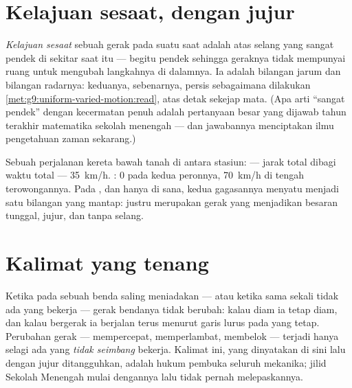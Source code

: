 \section{Kelajuan sesaat, dengan jujur}

\begin{definition}\label{def:g9:uniform-varied-motion:instant}
\emph{Kelajuan sesaat} sebuah gerak pada suatu
saat adalah  atas selang yang sangat pendek di
sekitar saat itu --- begitu pendek sehingga geraknya tidak mempunyai
ruang untuk mengubah langkahnya di dalamnya. Ia adalah bilangan jarum
 dan bilangan radarnya: keduanya, sebenarnya, 
persis sebagaimana dilakukan
\cref{met:g9:uniform-varied-motion:read}, atas detak sekejap mata.
(Apa arti ``sangat pendek'' dengan kecermatan penuh adalah pertanyaan
besar yang dijawab tahun terakhir matematika sekolah menengah --- dan
jawabannya menciptakan ilmu pengetahuan zaman sekarang.)
\end{definition}

\begin{example}\label{ex:g9:uniform-varied-motion:sidebyside}
Sebuah perjalanan kereta bawah tanah di antara stasiun:  --- jarak total dibagi waktu total --- \qty{35}{km/h}.
: $0$ pada kedua peronnya, \qty{70}{km/h} di tengah
terowongannya. Pada , dan hanya di sana, kedua
gagasannya menyatu menjadi satu bilangan yang mantap: 
justru merupakan gerak yang menjadikan  besaran tunggal, jujur,
dan tanpa selang.
\end{example}

\section{Kalimat yang tenang}

\begin{proposition}\label{prop:g9:uniform-varied-motion:inertia}
Ketika  pada sebuah benda saling meniadakan --- atau ketika sama
sekali tidak ada yang bekerja --- gerak bendanya tidak berubah: kalau
diam ia tetap diam, dan kalau bergerak ia berjalan terus menurut garis
lurus pada  yang tetap. Perubahan gerak --- mempercepat,
memperlambat, membelok --- terjadi hanya selagi ada  yang
\emph{tidak seimbang} bekerja. Kalimat ini, yang dinyatakan di sini
lalu dengan jujur ditangguhkan, adalah hukum pembuka seluruh mekanika;
jilid Sekolah Menengah mulai dengannya lalu tidak pernah melepaskannya.
\end{proposition}

